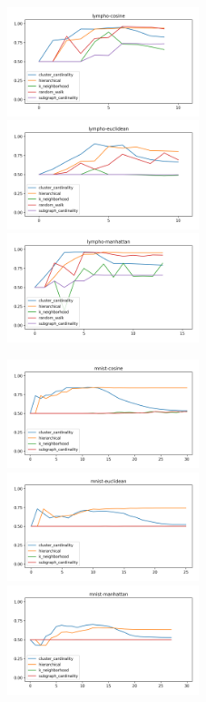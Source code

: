 \begin{figure}[!t]
\centering
\includegraphics[width=2.2in]{kdd/static/auc_vs_depth/lympho-cosine.png}
\includegraphics[width=2.2in]{kdd/static/auc_vs_depth/lympho-euclidean.png}
\includegraphics[width=2.2in]{kdd/static/auc_vs_depth/lympho-manhattan.png}

\includegraphics[width=2.2in]{kdd/static/auc_vs_depth/mnist-cosine.png}
\includegraphics[width=2.2in]{kdd/static/auc_vs_depth/mnist-euclidean.png}
\includegraphics[width=2.2in]{kdd/static/auc_vs_depth/mnist-manhattan.png}


\end{figure}
